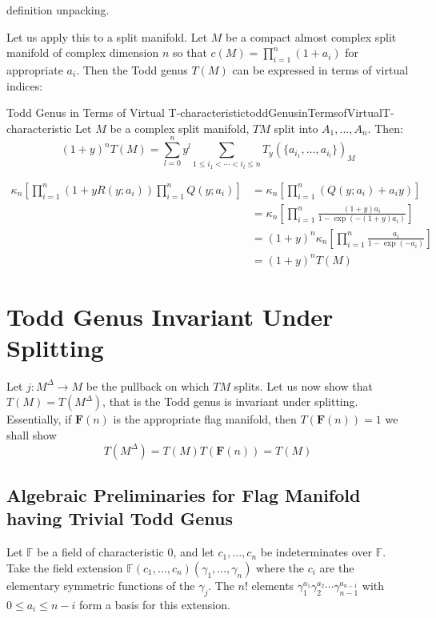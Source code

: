 \documentclass{ut-thesis}
\newenvironment{Proof}[1][]
  {\begin{ProofTcb}[#1]}
  {\end{ProofTcb}}
\renewcommand{\bf}[1]{\textbf{#1}}
\begin{document}
\begin{Proof}
  definition unpacking.
\end{Proof}



Let us apply this to a split manifold. Let $M$ be a compact almost complex split manifold of complex dimension
$n$ so that $c(M) = \prod_{i=1}^n (1+a_i)$ for appropriate $a_i$. Then the Todd genus $T(M)$ can be expressed in terms of virtual indices:
\begin{prop}{Todd Genus in Terms of Virtual T-characteristic}{toddGenusinTermsofVirtualT-characteristic}
  Let $M$ be a complex split manifold, $TM$ split into $A_1, ..., A_n$. Then:
    \[
      (1+y)^n T(M) = \sum_{l=0}^n y^l \sum_{1\leq i_1<\cdots<i_l\leq n} T_y(\{a_{i_1},\ldots,a_{i_l}\})_M
  \]
\end{prop}

\begin{Proof}
\begin{align*}
  \kappa_n\left[\prod_{i=1}^n (1+yR(y;a_i)) \prod_{i=1}^n Q(y;a_i)\right]
  &= \kappa_n\left[\prod_{i=1}^n (Q(y;a_i) + a_i y)\right] \\
  &= \kappa_n\left[\prod_{i=1}^n \frac{(1+y)a_i}{1-\exp(-(1+y)a_i)}\right] \\
  &= (1+y)^n \kappa_n\left[\prod_{i=1}^n \frac{a_i}{1-\exp(-a_i)}\right]\\
  &= (1+y)^n T(M)
\end{align*}
\end{Proof}



\section{Todd Genus Invariant Under Splitting}\label{sec:ToddGenusSplittingInvariatn}

Let $j: M^\Delta \to M$ be the pullback on which $TM$ splits. Let us now show that $T(M) = T(M^\Delta)$, that
is the Todd genus is invariant under splitting. Essentially, if $\bf{F}(n)$ is the appropriate flag manifold,
then $T(\bf{F}(n)) = 1$ we shall show
\[
  T(M^\Delta) = T(M)T(\bf{F}(n)) = T(M)
\]

\subsection*{Algebraic Preliminaries for Flag Manifold having Trivial Todd Genus} \label{sec:AlgebraicPreliminaries}

Let $\mathbb{F}$ be a field of characteristic 0, and let $c_1, \dots, c_n$ be indeterminates over
$\mathbb{F}$. Take the field extension $\mathbb{F}(c_1, \dots, c_n)(\gamma_1, \dots, \gamma_n)$ where the $c_i$ are the elementary symmetric functions of the $\gamma_j$. The $n!$ elements $\gamma_1^{a_1} \gamma_2^{a_2} \cdots \gamma_{n-1}^{a_{n-1}}$ with $0 \le a_i \le n-i$ form a basis for this extension.
\end{document}
